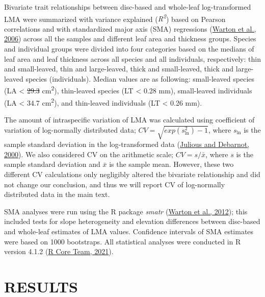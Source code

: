\documentclass[
  12pt,
  a4paper,
,tablecaptionabove
]{scrartcl}
\providecommand{\DIFaddtex}[1]{{\protect\color{blue}\uwave{#1}}} %
\providecommand{\DIFdeltex}[1]{{\protect\color{red}\sout{#1}}}                      %
\providecommand{\DIFaddbegin}{} %
\providecommand{\DIFaddend}{} %
\providecommand{\DIFdelbegin}{} %
\providecommand{\DIFdelend}{} %
\providecommand{\DIFadd}[1]{\texorpdfstring{\DIFaddtex{#1}}{#1}} %
\providecommand{\DIFdel}[1]{\texorpdfstring{\DIFdeltex{#1}}{}} %
\newcommand{\DIFscaledelfig}{0.5}
\newlength{\DIFdelgraphicswidth} %
\newlength{\DIFdelgraphicsheight} %
\newcommand{\DIFaddincludegraphics}[2][]{{\color{blue}\fbox{\DIFOincludegraphics[#1]{#2}}}} %
\newcommand{\DIFdelincludegraphics}[2][]{%
\sbox{\DIFdelgraphicsbox}{\DIFOincludegraphics[#1]{#2}}%
\settoboxwidth{\DIFdelgraphicswidth}{\DIFdelgraphicsbox} %
\settoboxtotalheight{\DIFdelgraphicsheight}{\DIFdelgraphicsbox} %
\scalebox{\DIFscaledelfig}{%
\parbox[b]{\DIFdelgraphicswidth}{\usebox{\DIFdelgraphicsbox}\\[-\baselineskip] \rule{\DIFdelgraphicswidth}{0em}}\llap{\resizebox{\DIFdelgraphicswidth}{\DIFdelgraphicsheight}{%
\setlength{\unitlength}{\DIFdelgraphicswidth}%
\begin{picture}(1,1)%
\thicklines\linethickness{2pt} %
{\color[rgb]{1,0,0}\put(0,0){\framebox(1,1){}}}%
{\color[rgb]{1,0,0}\put(0,0){\line( 1,1){1}}}%
{\color[rgb]{1,0,0}\put(0,1){\line(1,-1){1}}}%
\end{picture}%
}\hspace*{3pt}}} %
} %
\DeclareRobustCommand{\DIFaddbegin}{\DIFOaddbegin \let\includegraphics\DIFaddincludegraphics} %
\DeclareRobustCommand{\DIFaddend}{\DIFOaddend \let\includegraphics\DIFOincludegraphics} %
\DeclareRobustCommand{\DIFdelbegin}{\DIFOdelbegin \let\includegraphics\DIFdelincludegraphics} %
\DeclareRobustCommand{\DIFdelend}{\DIFOaddend \let\includegraphics\DIFOincludegraphics} %
\begin{document}
Bivariate trait relationships between disc-based and whole-leaf
log-transformed LMA were summarized with variance explained
(\emph{R\textsuperscript{2}}) based on Pearson correlations and with
standardized major axis (SMA) regressions
(\protect\hyperlink{ref-Warton2006}{Warton et al., 2006}) across all the
samples and different leaf area and thickness groups. Species and
individual groups were divided into four categories based on the medians
of leaf area and leaf thickness across all species and all individuals,
respectively: thin and small-leaved, thin and large-leaved, thick and
small-leaved, thick and large-leaved species (individuals). Median
values are as following: small-leaved species (LA \textless{} \DIFdelbegin \DIFdel{29.3
}\DIFdelend \DIFaddbegin \DIFadd{29.5
}\DIFaddend cm\textsuperscript{2}), thin-leaved species (LT \textless{} 0.28 mm),
small-leaved individuals (LA \textless{} 34.7 cm\textsuperscript{2}),
and thin-leaved individuals (LT \textless{} 0.26 mm).

The amount of intraspecific variation of LMA was calculated using
coefficient of variation of log-normally distributed data;
\(CV = \sqrt{exp(s_{\mathrm{ln}}^2) - 1}\), where \(s_{\mathrm{ln}}\) is
the sample standard deviation in the log-transformed data
(\protect\hyperlink{ref-Julious2000}{Julious and Debarnot, 2000}). We
also considered CV on the arithmetic scale; \(CV = s/\bar{x}\), where
\(s\) is the sample standard deviation and \(\bar{x}\) is the sample
mean. However, these two different CV calculations only negligibly
altered the bivariate relationship and did not change our conclusion,
and thus we will report CV of log-normally distributed data in the main
text.

SMA analyses were run using the R package \emph{smatr}
(\protect\hyperlink{ref-Warton2012a}{Warton et al., 2012}); this
included tests for slope heterogeneity and elevation differences between
disc-based and whole-leaf estimates of LMA values. Confidence intervals
of SMA estimates were based on 1000 bootstraps. All statistical analyses
were conducted in R version 4.1.2
(\protect\hyperlink{ref-RCoreTeam2021}{R Core Team, 2021}).

\hypertarget{results}{%
\section{RESULTS}\label{results}}
\end{document}
